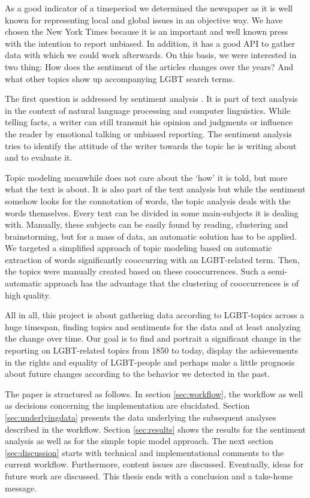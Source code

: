 \documentclass[10pt,a4paper,twocolumn]{scrartcl}
\begin{document}
As a good indicator of a timeperiod we determined the newspaper as it is well known for representing local and global issues in an objective way. We have chosen the New York Times because it is an important and well known press with the intention to report unbiased. In addition, it has a good API to gather data with which we could work afterwards. On this basis, we were interested in two thing: How does the sentiment of the articles changes over the years? And what other topics show up accompanying LGBT search terms.

The first question is addressed by sentiment analysis \citep{Nasukawa+Yi:2003, Godbole+al:2007, Cambria+al:2013}. It is part of text analysis in the context of natural language processing and computer linguistics. While telling facts, a writer can still transmit his opinion and judgments or influence the reader by emotional talking or unbiased reporting. The sentiment analysis tries to identify the attitude of the writer towards the topic he is writing about and to evaluate it.

Topic modeling \citep{Wallach:2006, Blei:2012} meanwhile does not care about the `how' it is told, but more what the text is about. It is also part of the text analysis but while the sentiment somehow looks for the connotation of words, the topic analysis deals with the words themselves. Every text can be divided in some main-subjects it is dealing with. Manually, these subjects can be easily found by reading, clustering and brainstorming, but for a mass of data, an automatic solution has to be applied. We targeted a simplified approach of topic modeling based on automatic extraction of words significantly cooccurring with an LGBT-related term. Then, the topics were manually created based on these cooccurrences. Such a semi-automatic approach has the advantage that the clustering of cooccurrences is of high quality.

All in all, this project is about gathering data according to LGBT-topics across a huge timespan, finding topics and sentiments for the data and at least analyzing the change over time. Our goal is to find and portrait a significant change in the reporting on LGBT-related topics from 1850 to today, display the achievements in the rights and equality of LGBT-people and perhaps make a little prognosis about future changes according to the behavior we detected in the past.

The paper is structured as follows. In section \ref{sec:workflow}, the workflow as well as decisions concerning the implementation are elucidated. Section \ref{sec:underlyingdata} presents the data underlying the subsequent analyses described in the workflow. Section \ref{sec:results} shows the results for the sentiment analysis as well as for the simple topic model approach. The next section \ref{sec:discussion} starts with technical and implementational comments to the current workflow. Furthermore, content issues are discussed. Eventually, ideas for future work are discussed. This thesis ends with a conclusion and a take-home message.
\end{document}
